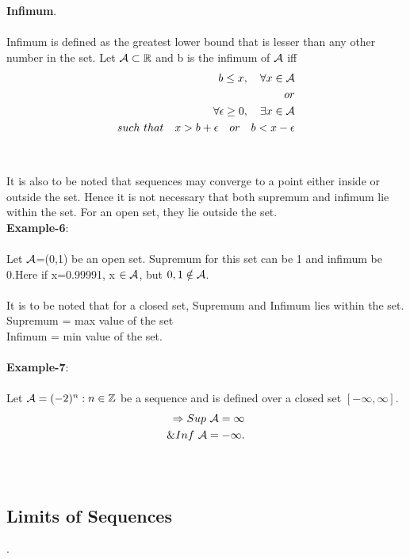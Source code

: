 \documentclass[a4paper]{article}
\begin{document}
\\
\\
\textbf{Infimum}.
\\
\\
Infimum is defined as the greatest lower bound that is lesser than any other number in the set. Let $\mathcal A \subset \mathbb R$ and b is the infimum of $\mathcal A$ iff\\
\begin{align}
\begin{split}
b \leq x, \quad \forall x \in \mathcal A\\
or\\
\forall \epsilon \geq 0,\quad \exists x \in \mathcal A 
\\such\  that \quad x > b+\epsilon \quad or \quad b < x-\epsilon
\end{split}
\end{align}
\\
\\
It is also to be noted that sequences may converge to a point either inside or outside the set. Hence it is not necessary that both supremum and infimum lie within the set. For an open set, they lie outside the set.
\\
\textbf{Example-6}:
\\
\\
Let $\mathcal A$=(0,1) be an open set. Supremum for this set can be 1 and infimum be 0.Here if x=0.99991, x $\in \mathcal A$, but $0, 1 \notin \mathcal A$. 
\\
\\
It is to be noted that for a closed set, Supremum and Infimum lies within the set.\\
Supremum = max value of the set \\ Infimum = min value of the set. 
\\
\\
\textbf{Example-7}:
\\
\\
Let $\mathcal A =(-2)^{n}:n\in \mathbb Z$ be a sequence and is defined over a closed set $[-\infty,\infty]$. 
\begin{align}
\begin{split}
\Rightarrow Sup\ \mathcal A = \infty\\
\& Inf\ \mathcal A = -\infty.
\end{split}
\end{align} 
\\
\\
\subsection{Limits of Sequences}.
\end{document}
